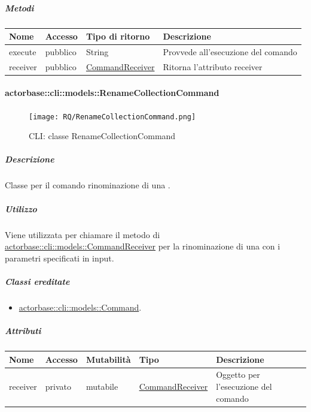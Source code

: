 \documentclass{scalatekids-article}
\begin{document}
\subparagraph{Metodi}

\begin{tabular}{| l | l | l | l |}
  \hline
  Nome & Accesso & Tipo di ritorno & Descrizione\\
  \hline
  execute & pubblico & String & Provvede all'esecuzione del comando\\
  \hline
  receiver & pubblico & \hyperref[sec:actorbase::cli::models::CommandReceiver]{CommandReceiver} & Ritorna l'attributo receiver\\
  \hline
\end{tabular}

\paragraph{actorbase::cli::models::RenameCollectionCommand}
\label{sec:actorbase::cli::models::RenameCollectionCommand}

\begin{figure}[H]
  \begin{center}
    \texttt{[image: RQ/RenameCollectionCommand.png]}
    \caption{CLI: classe RenameCollectionCommand}
  \end{center}
\end{figure}

\subparagraph{Descrizione}

Classe per il comando rinominazione di una .

\subparagraph{Utilizzo}

Viene utilizzata per chiamare il metodo di \hyperref[sec:actorbase::cli::models::CommandReceiver]{actorbase::cli::models::CommandReceiver} per la rinominazione di una  con i parametri specificati in input.

\subparagraph{Classi ereditate}

\begin{itemize}
\item \hyperref[sec:actorbase::cli::models::Command]{actorbase::cli::models::Command}.
\end{itemize}

\subparagraph{Attributi}

\begin{tabular}{| p{1cm} | p{1.5cm} | p{2cm} | p{4cm} | p{8.5cm} |}
  \hline
  Nome & Accesso & Mutabilità & Tipo & Descrizione\\
  \hline
  receiver & privato & mutabile & \hyperref[sec:actorbase::cli::models::CommandReceiver]{CommandReceiver} & Oggetto per l'esecuzione del comando\\
  \hline
\end{tabular}
\end{document}
